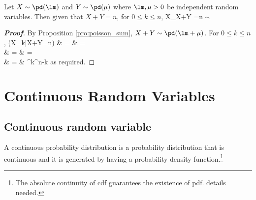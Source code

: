 \begin{proposition}\label{pro:poisson_sum_fixed_number}
Let $X \sim \pd(\lm)$ and $Y \sim \pd(\mu)$ where $\lm,\mu > 0$ be independent random variables. Then given that $X+Y = n$, for $0\leq k\leq n$,
\be
X_{X+Y =n} \sim \bd{}.
\ee
\end{proposition}

\begin{proof}[\bf Proof]
By Proposition \ref{pro:poisson_sum}, $X+Y \sim \pd(\lm+\mu)$. For $0\leq k\leq n$,
\beast
\pro(X=k|X+Y=n) & = &  =  \\
 & = &  =  \\
& = &  \bb{\frac{\lm}{\lm+\mu}}^k^{n-k}
\eeast
as required.
\end{proof}



\section{Continuous Random Variables}

\subsection{Continuous random variable}


\begin{definition}\label{def:continuous_probability_distribution}
A continuous probability distribution is a probability distribution that is continuous and it is generated by having a probability density function.\footnote{The absolute continuity of cdf guarantees the existence of pdf. details needed.}
\end{definition}


